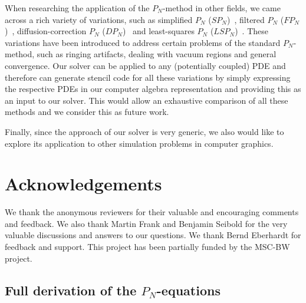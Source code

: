 \documentclass{egpubl}
\newcommand{\nocontentsline}[3]{}
\newcommand{\tocless}[2]{\bgroup\let\addcontentsline=\nocontentsline#1{#2}\egroup}
\begin{document}
When researching the application of the $P_N$-method in other fields, we came across a rich variety of variations, such as simplified $P_N$ ($SP_N$)~\cite{Ryan10}, filtered $P_N$ ($FP_N$)~\cite{Radice13}, diffusion-correction $P_N$ ($DP_N$)~\cite{Schaefer11} and least-squares $P_N$ ($LSP_N$)~\cite{Hansen14}. These variations have been introduced to address certain problems of the standard $P_N$-method, such as ringing artifacts, dealing with vacuum regions and general convergence. Our solver can be applied to any (potentially coupled) PDE and therefore can generate stencil code for all these variations by simply expressing the respective PDEs in our computer algebra representation and providing this as an input to our solver. This would allow an exhaustive comparison of all these methods and we consider this as future work.

Finally, since the approach of our solver is very generic, we also would like to explore its application to other simulation problems in computer graphics.



\section*{Acknowledgements}

We thank the anonymous reviewers for their valuable and encouraging comments and feedback. We also thank Martin Frank and Benjamin Seibold for the very valuable discussions and answers to our questions. We thank Bernd Eberhardt for feedback and support. This project has been partially funded by the MSC-BW project.



%

\tocless


\newpage

\onecolumn

\renewcommand{\familydefault}{\sfdefault}

\begin{appendices}

\tocless\section{Full derivation of the $P_N$-equations \label{appendix}}

\end{appendices}
\end{document}
